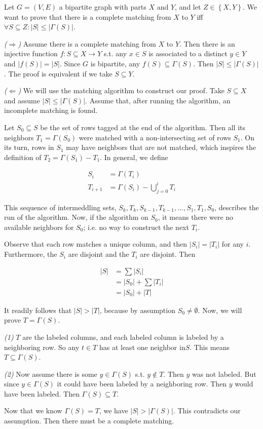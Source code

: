 \documentclass[a4paper, 12pt]{article}
\begin{document}
Let $G = (V, E)$ a bipartite graph with parts $X$ and $Y$, and let $Z \in
\left\{ X, Y \right\} $. We want to prove that there is a complete matching
from $X$ to $Y$ iff $\forall S \subseteq Z : |S| \leq |\Gamma(S)| $.

\textit{($\Rightarrow$)} Assume there is a complete matching from $X$ to $Y$.
Then there is an injective function $f : S \subseteq X \to Y$ s.t. any $x \in
S$ is associated to a distinct $y \in Y$ and $|f(S)| = |S|$. Since $G$ is
bipartite, any $f(S) \subseteq  \Gamma(S)$. Then $|S| \leq |\Gamma(S)|$. The
proof is equivalent if we take $S \subseteq Y$.

\textit{($\Leftarrow$)} We will use the matching algorithm to construct our
proof. Take $S \subseteq X$ and assume $|S| \leq |\Gamma(S)|$. Assume that,
after running the algorithm, an incomplete matching is found.

Let $S_0 \subseteq S$ be the set of rows tagged at the end of the algorithm.
Then all its neighbors $T_1 = \Gamma(S_0)$ were matched with a non-intersecting
set of rows $S_1$. On its turn, rows in $S_1$ may have neighbors that are not
matched, which inspires the definition of $T_2 = \Gamma(S_1) - T_1$.
In general, we define 

\begin{align*}
    S_i &= \Gamma(T_{i})\\
    T_{i+1} &= \Gamma(S_{i}) - \bigcup_{j=0}^{i} T_{i}
\end{align*}

This sequence of intermeddling sets, $S_{k}, T_k, S_{k-1}, T_{k-1}, \ldots, S_1,
T_1, S_0$, describes the run of the algorithm. Now, if the algorithm 
on $S_0$, it means there were no available neighbors for $S_0$; i.e. 
no way to construct the next $T_i$.

Observe that each row matches a unique column, and then $|S_i| = |T_i|$ for any
$i$. Furthermore, the $S_i$ are disjoint and the $T_i$ are disjoint. Then 

\begin{align*}
    |S| &= \sum |S_i| \\ 
        &= |S_0| + \sum |T_i| \\ 
        &= |S_0| + |T|
\end{align*}

It readily follows that $|S| > |T|$, because by assumption 
$S_0 \neq \emptyset$. Now, we will prove $T = \Gamma(S)$.

\textit{(1)} $T$ are the labeled columns, and each labeled column 
is labeled by a neighboring row. So any $t \in T$ has at least 
one neighbor in$ S$. This means $T \subseteq \Gamma(S)$.

\textit{(2)} Now assume there is some $y \in \Gamma(S)$ s.t. $y \not\in T$.
Then $y$ was not labeled. But since $y \in \Gamma(S)$ it 
could have been labeled by a neighboring row.
Then $y$ would have been labeled. Then $\Gamma(S) \subseteq T$.

Now that we know $\Gamma(S) = T$, we have $|S| > |\Gamma(S)|$.
This contradicts our assumption. Then there must 
be a complete matching.
\end{document}
